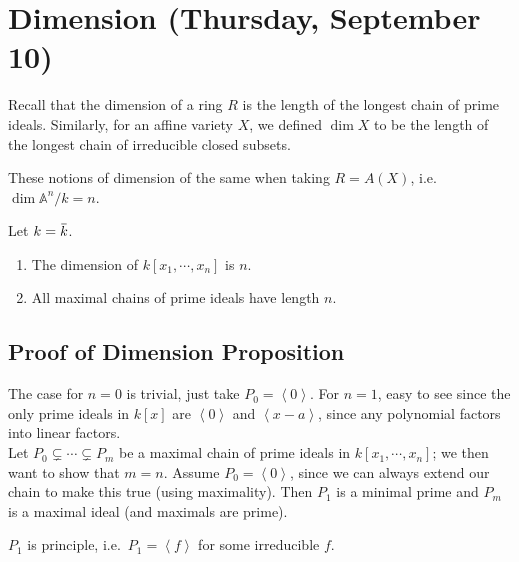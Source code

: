 \hypertarget{dimension-thursday-september-10}{%
\section{Dimension (Thursday, September
10)}\label{dimension-thursday-september-10}}

Recall that the dimension of a ring \(R\) is the length of the longest
chain of prime ideals. Similarly, for an affine variety \(X\), we
defined \(\dim X\) to be the length of the longest chain of irreducible
closed subsets.

These notions of dimension of the same when taking \(R = A(X)\),
i.e.~\(\dim {\mathbb{A}}^n/k = n\).

\begin{proposition}[Dimensions]

Let
\(k = \mkern 1.5mu\overline{\mkern-1.5muk\mkern-1.5mu}\mkern 1.5mu\).

\begin{enumerate}
\def\labelenumi{\alph{enumi}.}
\tightlist
\item
  The dimension of \(k[x_1, \cdots, x_n]\) is \(n\).
\item
  All maximal chains of prime ideals have length \(n\).
\end{enumerate}

\end{proposition}

\hypertarget{proof-of-dimension-proposition}{%
\subsection{Proof of Dimension
Proposition}\label{proof-of-dimension-proposition}}

The case for \(n=0\) is trivial, just take
\(P_0 = \left\langle{0}\right\rangle\). For \(n=1\), easy to see since
the only prime ideals in \(k[x]\) are \(\left\langle{0}\right\rangle\)
and \(\left\langle{x-a}\right\rangle\), since any polynomial factors
into linear factors.\\

Let \(P_0 \subsetneq \cdots \subsetneq P_m\) be a maximal chain of prime
ideals in \(k[x_1, \cdots, x_{n}]\); we then want to show that \(m=n\).
Assume \(P_0 = \left\langle{0}\right\rangle\), since we can always
extend our chain to make this true (using maximality). Then \(P_1\) is a
minimal prime and \(P_m\) is a maximal ideal (and maximals are prime).

\begin{claim}

\(P_1\) is principle, i.e.~\(P_1 = \left\langle{f}\right\rangle\) for
some irreducible \(f\).

\end{claim}

